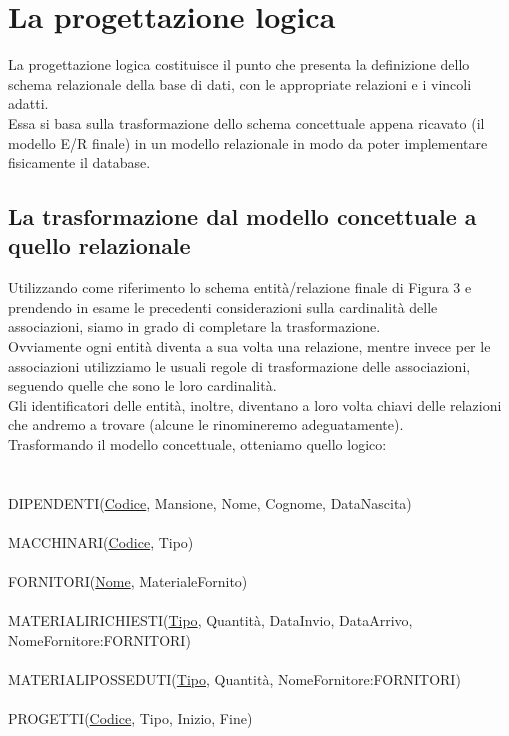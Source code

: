 \documentclass[a4paper,12pt,italian]{article}
\begin{document}
\section{La progettazione logica}
La progettazione logica costituisce il punto che presenta la definizione dello schema relazionale della base di dati, con le appropriate relazioni e i vincoli adatti. \\
Essa si basa sulla trasformazione dello schema concettuale appena ricavato (il modello E/R finale) in un modello relazionale in modo da poter implementare fisicamente il database.

\subsection{La trasformazione dal modello concettuale a quello relazionale}
Utilizzando come riferimento lo schema entità/relazione finale di Figura 3 e prendendo in esame le precedenti considerazioni sulla cardinalità delle associazioni, siamo in grado di completare la trasformazione. \\
Ovviamente ogni entità diventa a sua volta una relazione, mentre invece per le associazioni utilizziamo le usuali regole di trasformazione delle associazioni, seguendo quelle che sono le loro cardinalità. \\
Gli identificatori delle entità, inoltre, diventano a loro volta chiavi delle relazioni che andremo a trovare (alcune le rinomineremo adeguatamente). \\
Trasformando il modello concettuale, otteniamo quello logico: \\ \\ \\
DIPENDENTI(\underline{Codice}, Mansione, Nome, Cognome, DataNascita) \\ \\
MACCHINARI(\underline{Codice}, Tipo) \\ \\
FORNITORI(\underline{Nome}, MaterialeFornito) \\ \\
MATERIALIRICHIESTI(\underline{Tipo}, Quantità, DataInvio, DataArrivo, NomeFornitore:FORNITORI) \\ \\
MATERIALIPOSSEDUTI(\underline{Tipo}, Quantità, NomeFornitore:FORNITORI) \\ \\
PROGETTI(\underline{Codice}, Tipo, Inizio, Fine) \\ \\
\end{document}
